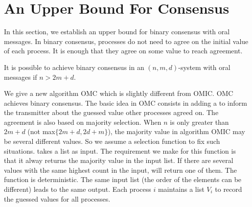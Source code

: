 \section{An Upper Bound For Consensus}\label{sec:consensus}

In this section, we establish an upper bound for binary consensus with oral messages. 
In binary consensus, processes do not need to agree on the initial value of each process. It is enough that they agree on some value to reach agreement.

\begin{theorem} \label{thmConsensus}
It is possible to achieve binary consensus in an  $(n,m,d)$-system with oral messages if  $n>2m+d$.
\end{theorem}

We give a new algorithm OMC which is slightly different from OMIC. OMC achieves binary consensus.
The basic idea in OMC consists in adding a  to inform the transmitter about the guessed value other processes agreed on. The agreement is also based on majority selection. When $n$ is only greater than $2m+d$ (not max$\{2m+d,2d+m\}$), the majority value in algorithm OMIC may be several different values.
So we assume a selection function  to fix such situations. 
 takes a list as input. 
The requirement we make for this function is that it alway returns the majority value in the input list. 
If there are several values with the same highest count in the input,  will return one of them. 
The function is deterministic. The same input list (the order of the elements can be different) leads to the same output. 
Each process $i$ maintains a list $V_i$ to record the
guessed values for all processes.

